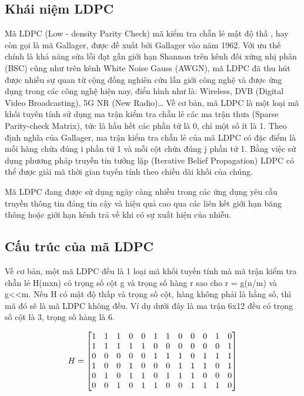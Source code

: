 \documentclass{article}
\begin{document}
\subsection{Khái niệm LDPC }

Mã LDPC (Low - density Parity Check) mã kiểm tra chẵn lẻ mật độ thấ , hay còn gọi là mã Gallager, được đề xuất bởi Gallager vào năm 1962. Với ưu thế chính là khả năng sửa lỗi đạt gần giới hạn Shannon trên kênh đối xứng nhị phân (BSC) cũng như trên kênh White Noise Gauss  (AWGN), mã LDPC đã thu hút được nhiều sự quan từ cộng đồng nghiên cứu lẫn giới công nghệ và được ứng dụng trong các công nghệ hiện nay, điển hình như là: Wireless, DVB (Digital Video Broadcasting), 5G NR (New Radio)…  Về cơ bản, mã LDPC là một loại mã khối tuyến tính sử dụng ma trận kiểm tra chẵn lẻ các ma trận thưa (Sparse Parity-check Matrix), tức là hầu hết các phần tử là 0, chỉ một số ít là 1. Theo định nghĩa của Gallager, ma trận kiểm tra chẵn lẻ của mã LDPC có đặc điểm là mỗi hàng chứa đúng i phần tử 1 và mỗi cột chứa đúng j phần tử 1. Bằng việc sử dụng phương pháp truyền tin tưởng lặp (Iterative Belief  Propagation) LDPC có thể được giải mã thời gian tuyến tính theo chiều dài khối của chúng.

Mã LDPC đang được sử dụng ngày càng nhiều trong các ứng dụng yêu cầu truyền thông tin đáng tin cậy và hiệu quả cao qua các liên kết giới hạn băng thông hoặc giới hạn kênh trả về khi có sự xuất hiện của nhiễu.

\subsection{Cấu trúc của mã LDPC}
Về cơ bản, một mã LDPC đều là 1 loại mã khối tuyến tính mà mã trận kiểm tra chẵn lẻ H(mxn) có trọng số cột g và trọng số hàng r sao cho r = g(n/m) và g<<m. Nếu H có mật độ thấp và trọng số cột, hàng không phải là hằng số, thì mã đó sẽ là mã LDPC không đều. Ví dụ dưới đây là ma trận 6x12 đều có trọng số cột là 3, trọng số hàng là 6.

\begin{equation*}
\setcounter{MaxMatrixCols}{20}
H = 
\begin{bmatrix}
1 & 1 & 1 & 0 & 0 & 1 & 1 & 0 & 0 & 0 & 1 & 0 \\
1 & 1 & 1 & 1 & 1 & 0 & 0 & 0 & 0 & 0 & 0 & 1 \\
0 & 0 & 0 & 0 & 0 & 1 & 1 & 1 & 0 & 1 & 1 & 1 \\
1 & 0 & 0 & 1 & 0 & 0 & 0 & 1 & 1 & 1 & 0 & 1 \\
0 & 1 & 0 & 1 & 1 & 0 & 1 & 1 & 1 & 0 & 0 & 0 \\
0 & 0 & 1 & 0 & 1 & 1 & 0 & 0 & 1 & 1 & 1 & 0 \\
\end{bmatrix}
\end{equation*}
\end{document}
